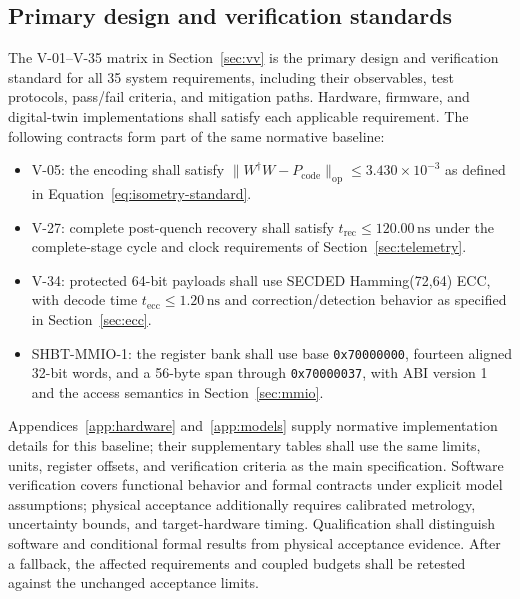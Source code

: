 \documentclass[11pt,a4paper]{article}
\newcommand{\op}{\mathrm{op}}
\newcommand{\code}{\mathrm{code}}
\newcommand{\unit}[1]{\,\mathrm{#1}}
\begin{document}
\subsection{Primary design and verification standards}
\label{sec:standards}
The V-01--V-35 matrix in Section~\ref{sec:vv} is the primary design and verification
standard for all 35 system requirements, including their observables, test protocols,
pass/fail criteria, and mitigation paths. Hardware, firmware, and digital-twin
implementations shall satisfy each applicable requirement. The following contracts
form part of the same normative baseline:
\begin{itemize}[noitemsep]
\item V-05: the encoding shall satisfy
$\|W^\dagger W-P_\code\|_\op\le3.430\times10^{-3}$
as defined in Equation~\ref{eq:isometry-standard}.
\item V-27: complete post-quench recovery shall satisfy
$t_{\mathrm{rec}}\le120.00\unit{ns}$ under the complete-stage cycle and clock
requirements of Section~\ref{sec:telemetry}.
\item V-34: protected 64-bit payloads shall use SECDED Hamming(72,64) ECC,
with decode time $t_{\mathrm{ecc}}\le1.20\unit{ns}$ and correction/detection
behavior as specified in Section~\ref{sec:ecc}.
\item SHBT-MMIO-1: the register bank shall use base \texttt{0x70000000},
fourteen aligned 32-bit words, and a 56-byte span through \texttt{0x70000037},
with ABI version 1 and the access semantics in Section~\ref{sec:mmio}.
\end{itemize}
Appendices~\ref{app:hardware} and~\ref{app:models} supply normative implementation
details for this baseline; their supplementary tables shall use the same limits,
units, register offsets, and verification criteria as the main specification.
Software verification covers functional behavior and formal contracts under explicit
model assumptions; physical acceptance additionally requires calibrated metrology,
uncertainty bounds, and target-hardware timing. Qualification shall distinguish
software and conditional formal results from physical acceptance evidence.
After a fallback, the affected requirements and coupled budgets shall be retested
against the unchanged acceptance limits.
\end{document}
